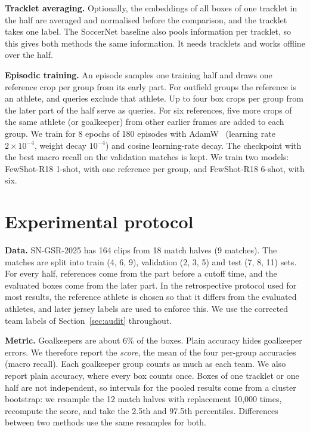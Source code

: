 \documentclass[10pt]{article}
\begin{document}
\textbf{Tracklet averaging.} Optionally, the embeddings of all boxes of one tracklet in the half are averaged and normalised before the comparison, and the tracklet takes one label. The SoccerNet baseline also pools information per tracklet, so this gives both methods the same information. It needs tracklets and works offline over the half.

\textbf{Episodic training.} An episode samples one training half and draws one reference crop per group from its early part. For outfield groups the reference is an athlete, and queries exclude that athlete. Up to four box crops per group from the later part of the half serve as queries. For six references, five more crops of the same athlete (or goalkeeper) from other earlier frames are added to each group. We train for 8 epochs of 180 episodes with AdamW~\cite{loshchilov2017adamw} (learning rate $2\times10^{-4}$, weight decay $10^{-4}$) and cosine learning-rate decay. The checkpoint with the best macro recall on the validation matches is kept. We train two models: FewShot-R18 1-shot, with one reference per group, and FewShot-R18 6-shot, with six.

\section{Experimental protocol}
\label{sec:protocol}

\textbf{Data.} SN-GSR-2025 has 164 clips from 18 match halves (9 matches). The matches are split into train (4, 6, 9), validation (2, 3, 5) and test (7, 8, 11) sets. For every half, references come from the part before a cutoff time, and the evaluated boxes come from the later part. In the retrospective protocol used for most results, the reference athlete is chosen so that it differs from the evaluated athletes, and later jersey labels are used to enforce this. We use the corrected team labels of Section~\ref{sec:audit} throughout.

\textbf{Metric.} Goalkeepers are about 6\% of the boxes. Plain accuracy hides goalkeeper errors. We therefore report the \emph{score}, the mean of the four per-group accuracies (macro recall). Each goalkeeper group counts as much as each team. We also report plain accuracy, where every box counts once. Boxes of one tracklet or one half are not independent, so intervals for the pooled results come from a cluster bootstrap: we resample the 12 match halves with replacement 10,000 times, recompute the score, and take the 2.5th and 97.5th percentiles. Differences between two methods use the same resamples for both.
\end{document}
